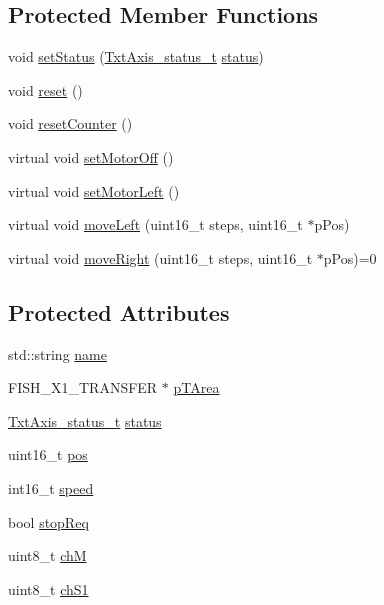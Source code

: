\subsection*{Protected Member Functions}
\begin{DoxyCompactItemize}
\item 
void \hyperlink{classft_1_1_txt_axis_a5c2e17eee902a907ee3ab108dd4faf02}{set\+Status} (\hyperlink{namespaceft_a05630ec9d5a49c43a00ca107cfe6b350}{Txt\+Axis\+\_\+status\+\_\+t} \hyperlink{classft_1_1_txt_axis_a2f74c132b00116f57ceb65cab7a525ee}{status})
\item 
void \hyperlink{classft_1_1_txt_axis_a1abdff278919fee8c859fdd080bf82ff}{reset} ()
\item 
void \hyperlink{classft_1_1_txt_axis_adf2ff312dd0eec4ec2e70c9979a93d7d}{reset\+Counter} ()
\item 
virtual void \hyperlink{classft_1_1_txt_axis_a39b5715dab5637e92f2ca817a05be930}{set\+Motor\+Off} ()
\item 
virtual void \hyperlink{classft_1_1_txt_axis_a408c5cfc000eb1f5ab49db8713906b27}{set\+Motor\+Left} ()
\item 
virtual void \hyperlink{classft_1_1_txt_axis_ae5398be07f55ebf29cd99969f846be30}{move\+Left} (uint16\+\_\+t steps, uint16\+\_\+t $\ast$p\+Pos)
\item 
virtual void \hyperlink{classft_1_1_txt_axis_aac0aaaa04969160f42542e76057ccb75}{move\+Right} (uint16\+\_\+t steps, uint16\+\_\+t $\ast$p\+Pos)=0
\end{DoxyCompactItemize}
\subsection*{Protected Attributes}
\begin{DoxyCompactItemize}
\item 
std\+::string \hyperlink{classft_1_1_txt_axis_a358af2b2ed1709b40ab6c9768c2795ef}{name}
\item 
F\+I\+S\+H\+\_\+\+X1\+\_\+\+T\+R\+A\+N\+S\+F\+ER $\ast$ \hyperlink{classft_1_1_txt_axis_ae5521c2eda7b80599ed6340f6a8192f2}{p\+T\+Area}
\item 
\hyperlink{namespaceft_a05630ec9d5a49c43a00ca107cfe6b350}{Txt\+Axis\+\_\+status\+\_\+t} \hyperlink{classft_1_1_txt_axis_a2f74c132b00116f57ceb65cab7a525ee}{status}
\item 
uint16\+\_\+t \hyperlink{classft_1_1_txt_axis_a51ccb254804e142bc26604e1efe94725}{pos}
\item 
int16\+\_\+t \hyperlink{classft_1_1_txt_axis_a3103b6972533eaac191a0a9e5c2e0564}{speed}
\item 
bool \hyperlink{classft_1_1_txt_axis_a27e59819797bfc1885d2fc4d3ebbe209}{stop\+Req}
\item 
uint8\+\_\+t \hyperlink{classft_1_1_txt_axis_a3a8988acb2f578fe96312221205c50c4}{chM}
\item 
uint8\+\_\+t \hyperlink{classft_1_1_txt_axis_a9b155580a8dcc876c8e0c4b9c92041e7}{ch\+S1}
\end{DoxyCompactItemize}
